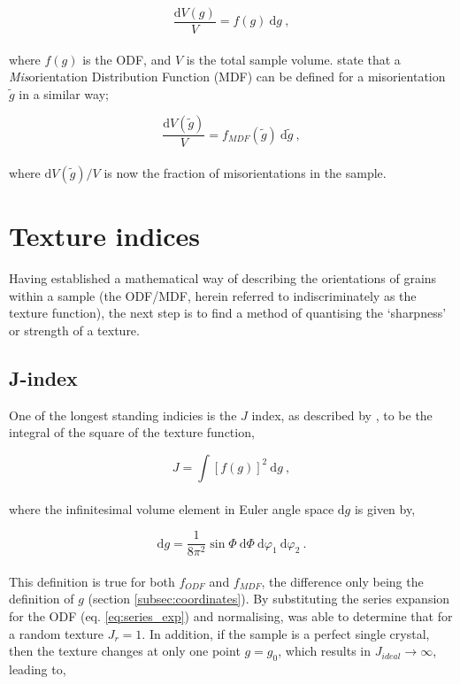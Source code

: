 \documentclass[a4paper,12pt]{report}
\numberwithin{equation}{chapter}
\begin{document}
\begin{equation}
\frac{\mathrm{d}V(g)}{V} = f(g)\ \mathrm{d}g\ ,
\end{equation}
\\
where $f(g)$ is the ODF, and $V$ is the total sample volume. \cite{Mainprice} state that a \emph{Mis}orientation Distribution Function (MDF) can be defined for a misorientation $\tilde{g}$ in a similar way;




\begin{equation}
\frac{\mathrm{d}V(\tilde{g})}{V} = f_{MDF}(\tilde{g})\ \mathrm{d}\tilde{g}\ ,
\end{equation}
\\
where $\mathrm{d}V(\tilde{g})/V$ is now the fraction of misorientations in the sample.


\section{Texture indices} \label{sec:indicies}
Having established a mathematical way of describing the orientations of grains within a sample (the ODF/MDF, herein referred to indiscriminately as the texture function), the next step is to find a method of quantising the \lq{}sharpness\rq{} or strength of a texture.

\subsection{J-index} \label{subsec:j-index}
 One of the longest standing indicies is the $J$ index, as described by \cite{bunge1982texture}, to be the integral of the square of the texture function,




\begin{equation}
J = \int [ f(g) ]^2\ \mathrm{d}g \ ,
\end{equation} 
\\
where the infinitesimal volume element in Euler angle space $\mathrm{d}g$ is given by,




\begin{equation}
\mathrm{d}g = \frac{1}{8\pi^2} \sin\Phi\ \mathrm{d}\Phi\ \mathrm{d}\varphi_1\ \mathrm{d}\varphi_2\ .
\end{equation} 
\\
This definition is true for both $f_{ODF}$ and $f_{MDF}$, the difference only being the definition of $g$ (section \ref{subsec:coordinates}). By substituting the series expansion for the ODF (eq. \ref{eq:series_exp})  and normalising, \cite{bunge1982texture} was able to determine that for a random texture $J_r = 1$. In addition, if the sample is a perfect single crystal, then the texture changes at only one point $g = g_0$, which results in $J_{ideal} \to \infty$, leading to,
\end{document}
